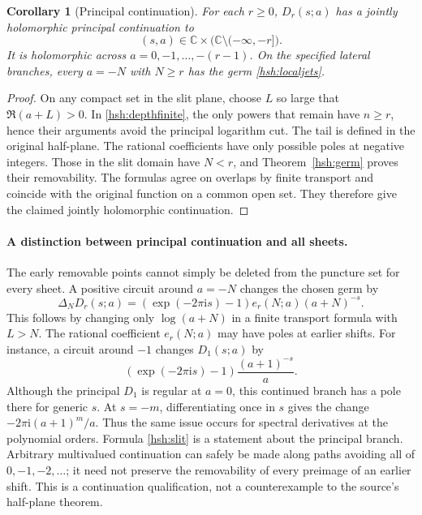 \documentclass[11pt,a4paper]{article}
\numberwithin{equation}{section}
\newtheorem{corollary}[theorem]{Corollary}
\theoremstyle{definition}
\theoremstyle{remark}
\begin{document}
\begin{corollary}[Principal continuation]\label{hsh:principal}
For each $r\geq0$, $D_r(s;a)$ has a jointly holomorphic principal
continuation to
\begin{equation}\label{hsh:slit}
       (s,a)\in\mathbb C\times
                         \bigl(\mathbb C\setminus(-\infty,-r]\bigr).
\end{equation}
It is holomorphic across $a=0,-1,\ldots,-(r-1)$.  On the
specified lateral branches, every $a=-N$ with $N\geq r$ has
the germ \eqref{hsh:localjets}.
\end{corollary}

\begin{proof}
On any compact set in the slit plane, choose $L$ so large that
$\Re(a+L)>0$.  In \eqref{hsh:depthfinite}, the only powers that
remain have $n\geq r$, hence their arguments avoid the principal
logarithm cut.  The tail is defined in the original half-plane.
The rational coefficients have only possible poles at negative
integers.  Those in the slit domain have $N<r$, and
Theorem~\ref{hsh:germ} proves their removability.  The formulas
agree on overlaps by finite transport and coincide with the
original function on a common open set.  They therefore give
the claimed jointly holomorphic continuation.
\end{proof}

\paragraph{A distinction between principal continuation and all sheets.}
The early removable points cannot simply be deleted from the
puncture set for every sheet.  A positive circuit around $a=-N$
changes the chosen germ by
\begin{equation}\label{hsh:monodromy}
 \Delta_N D_r(s;a)=
 (\exp(-2\pi\mathrm i s)-1)e_r(N;a)(a+N)^{-s}.
\end{equation}
This follows by changing only $\log(a+N)$ in a finite transport
formula with $L>N$.  The rational coefficient $e_r(N;a)$ may have
poles at earlier shifts.  For instance, a circuit around $-1$
changes $D_1(s;a)$ by
\[
       (\exp(-2\pi\mathrm i s)-1)\frac{(a+1)^{-s}}a.
\]
Although the principal $D_1$ is regular at $a=0$, this continued
branch has a pole there for generic $s$.  At $s=-m$, differentiating
once in $s$ gives the change $-2\pi\mathrm i(a+1)^m/a$.
Thus the same issue occurs for spectral derivatives at the polynomial
orders.  Formula \eqref{hsh:slit} is a statement about the principal
branch.  Arbitrary multivalued continuation can safely be made along
paths avoiding all of $0,-1,-2,\ldots$; it need not preserve the
removability of every preimage of an earlier shift.  This is a
continuation qualification, not a counterexample to the source's
half-plane theorem.
\end{document}
